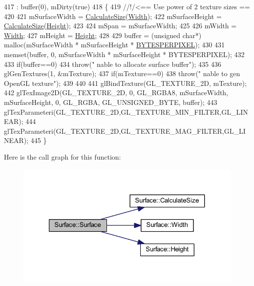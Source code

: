 \begin{DoxyCode}
417                                       : buffer(0), mDirty(\textcolor{keyword}{true})
418 \{\textcolor{comment}{}
419 \textcolor{comment}{    //!/<== Use power of 2 texture sizes ==}
420 \textcolor{comment}{}
421     mSurfaceWidth = \hyperlink{class_surface_aeb8a8540f415a4d29c440667e8532e91}{CalculateSize}(\hyperlink{class_surface_ae76d7c2fa208df6979a77cc60e8105c0}{Width});
422     mSurfaceHeight = \hyperlink{class_surface_aeb8a8540f415a4d29c440667e8532e91}{CalculateSize}(\hyperlink{class_surface_ab901f48d51b3fd427415b580dc15518c}{Height});
423 
424     mSpan = mSurfaceWidth;
425 
426     mWidth = \hyperlink{class_surface_ae76d7c2fa208df6979a77cc60e8105c0}{Width};
427     mHeight = \hyperlink{class_surface_ab901f48d51b3fd427415b580dc15518c}{Height};
428 
429     buffer = (\textcolor{keywordtype}{unsigned} \textcolor{keywordtype}{char}*) malloc(mSurfaceWidth * mSurfaceHeight * 
      \hyperlink{supportcode_8h_afb291d1c2072afc3383bc2e688e75d3b}{BYTESPERPIXEL});
430 
431     memset(buffer, 0, mSurfaceWidth * mSurfaceHeight * BYTESPERPIXEL);
432 
433     \textcolor{keywordflow}{if}(buffer==0)
434         \textcolor{keywordflow}{throw}(\textcolor{stringliteral}{" nable to allocate surface buffer"});
435 
436     glGenTextures(1, &mTexture);
437     \textcolor{keywordflow}{if}(mTexture==0)
438         \textcolor{keywordflow}{throw}(\textcolor{stringliteral}{" nable to gen OpenGL texture"});
439 
440 
441     glBindTexture(GL\_TEXTURE\_2D, mTexture);
442     glTexImage2D(GL\_TEXTURE\_2D, 0, GL\_RGBA8, mSurfaceWidth, mSurfaceHeight, 0, GL\_RGBA, GL\_UNSIGNED\_BYTE, 
      buffer);
443     glTexParameteri(GL\_TEXTURE\_2D,GL\_TEXTURE\_MIN\_FILTER,GL\_LINEAR);
444     glTexParameteri(GL\_TEXTURE\_2D,GL\_TEXTURE\_MAG\_FILTER,GL\_LINEAR);
445 \}
\end{DoxyCode}
Here is the call graph for this function\+:\nopagebreak
\begin{figure}[H]
\begin{center}
\leavevmode
\includegraphics[width=321pt]{class_surface_a323ba9165c8635e84eb0c490fe88d846_cgraph}
\end{center}
\end{figure}
\mbox{\label{class_surface_a89de75c95cb550d432f3ea4ed1429db0}} 
